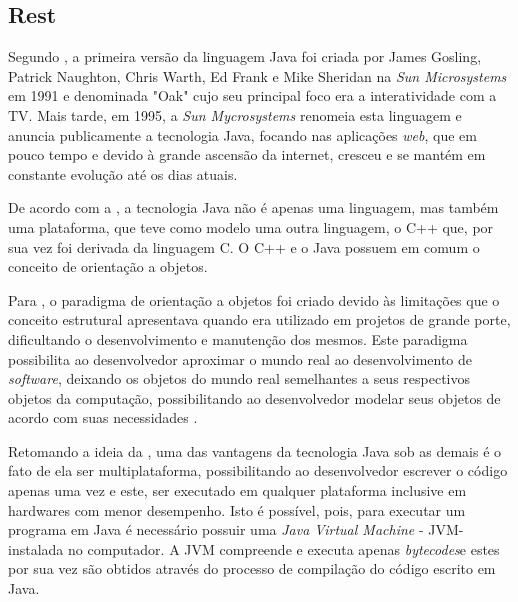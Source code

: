 \subsection{Rest}

\par Segundo , a primeira versão da linguagem Java foi criada por James Gosling, Patrick Naughton, Chris Warth, Ed Frank e Mike Sheridan na \textit{Sun Microsystems} em 1991 e denominada "Oak" cujo seu principal foco era a interatividade com a TV. Mais tarde, em 1995, a \textit{Sun Mycrosystems} renomeia esta linguagem e anuncia publicamente a tecnologia Java, focando nas aplicações \textit{web}, que em pouco tempo e devido à grande ascensão da internet, cresceu e se mantém em constante evolução até os dias atuais.

\par De acordo com a , a tecnologia Java não é apenas uma linguagem, mas também uma plataforma, que teve como modelo uma outra linguagem, o C++ que, por sua vez foi derivada da linguagem C. O C++ e o Java possuem em comum o conceito de orientação a objetos.

\par Para , o paradigma de orientação a objetos foi criado devido às limitações que o conceito estrutural apresentava quando era utilizado em projetos de grande porte, dificultando o desenvolvimento e manutenção dos mesmos. Este paradigma possibilita ao desenvolvedor aproximar o mundo real ao desenvolvimento de \textit{software}, deixando os objetos do mundo real semelhantes a seus respectivos objetos da computação, possibilitando ao desenvolvedor modelar seus objetos de acordo com suas necessidades \cite{tcc_univas_faria_aspectj_programacao_orientada_aspecto_java}.

\par Retomando a ideia da , uma das vantagens da tecnologia Java sob as demais é o fato de ela ser multiplataforma, possibilitando ao desenvolvedor escrever o código apenas uma vez e este, ser executado em qualquer plataforma inclusive em hardwares com menor desempenho. Isto é possível, pois, para executar um programa em Java é necessário possuir uma \textit{Java Virtual Machine} - JVM\footnotemark[12] - instalada no computador. A JVM compreende e executa apenas \textit{bytecodes}\footnotemark[13] e estes por sua vez são obtidos através do processo de compilação do código escrito em Java.

